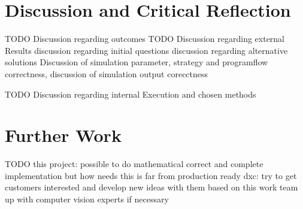 \section{Discussion and Critical Reflection}

TODO Discussion regarding outcomes
TODO Discussion regarding external Results
discussion regarding initial questions
discussion regarding alternative solutions
Discussion of simulation parameter, strategy and programflow correctness, discussion of simulation output corecctness

TODO  Discussion regarding internal Execution and chosen methods


\section{Further Work}

TODO
this project: possible to do mathematical correct and complete implementation
but how needs this is far from production ready
dxc: try to get customers interested and develop new ideas with them based on this work
team up with computer vision experts if necessary

